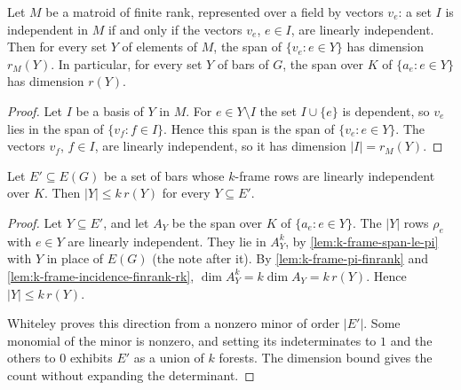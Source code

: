 \begin{lemma}
  \label{lem:k-frame-incidence-finrank-rk}
  \leanok
  Let $M$ be a matroid of finite rank, represented over a field by
  vectors $v_e$: a set $I$ is independent in $M$ if and only if the
  vectors $v_e$, $e \in I$, are linearly independent. Then for every
  set $Y$ of elements of $M$, the span of $\{v_e : e \in Y\}$ has
  dimension $r_M(Y)$. In particular, for every set $Y$ of bars of $G$,
  the span over $K$ of $\{a_e : e \in Y\}$ has dimension $r(Y)$.
\end{lemma}
\begin{proof}
  \leanok
  Let $I$ be a basis of $Y$ in $M$. For $e \in Y \setminus I$ the set
  $I \cup \{e\}$ is dependent, so $v_e$ lies in the span of
  $\{v_f : f \in I\}$. Hence this span is the span of
  $\{v_e : e \in Y\}$. The vectors $v_f$, $f \in I$, are linearly
  independent, so it has dimension $|I| = r_M(Y)$.
\end{proof}

\begin{lemma}
  \label{lem:k-frame-nonzero-monomial-forest}
  \leanok
  Let $E' \subseteq E(G)$ be a set of bars whose $k$-frame rows are
  linearly independent over $K$. Then $|Y| \le k\, r(Y)$ for every
  $Y \subseteq E'$.
\end{lemma}
\begin{proof}
  \leanok
  Let $Y \subseteq E'$, and let $A_Y$ be the span over $K$ of
  $\{a_e : e \in Y\}$. The $|Y|$ rows $\rho_e$ with $e \in Y$ are
  linearly independent. They lie in $A_Y^k$, by
  \cref{lem:k-frame-span-le-pi} with $Y$ in place of $E(G)$ (the note
  after it).
  By \cref{lem:k-frame-pi-finrank} and
  \cref{lem:k-frame-incidence-finrank-rk},
  $\dim A_Y^k = k \dim A_Y = k\, r(Y)$. Hence $|Y| \le k\, r(Y)$.

  Whiteley proves this direction from a nonzero minor of order $|E'|$.
  Some monomial of the minor is nonzero, and setting its indeterminates
  to $1$ and the others to $0$ exhibits $E'$ as a union of $k$ forests.
  The dimension bound gives the count without expanding the
  determinant.
\end{proof}

